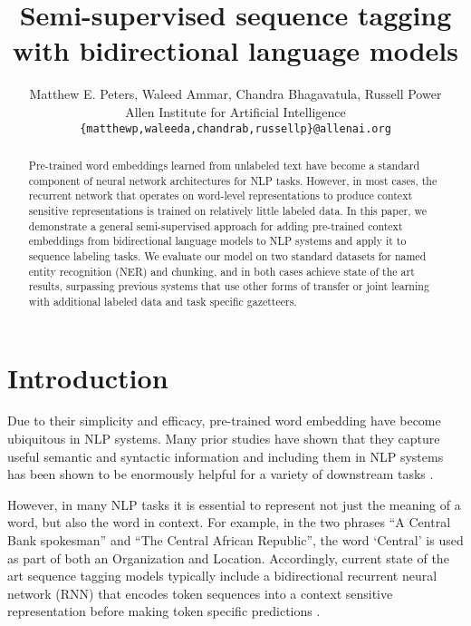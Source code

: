 \documentclass[11pt,a4paper]{article}
\title{Semi-supervised sequence tagging with bidirectional language models}
\author{Matthew E. Peters, Waleed Ammar, Chandra Bhagavatula, Russell Power \\
    Allen Institute for Artificial Intelligence \\
    {\tt \{matthewp,waleeda,chandrab,russellp\}@allenai.org}
}
\date{}
\newcommand\waadd[1]{#1}
\begin{document}
\maketitle
\begin{abstract}
Pre-trained word embeddings learned from unlabeled text
have become a standard component of neural network architectures for
NLP tasks.  However, in most cases, the recurrent
network that operates on word-level representations to produce context sensitive representations is trained on relatively little labeled data.
In this paper, we demonstrate a general semi-supervised approach for adding pre-trained context embeddings from bidirectional
language models to NLP systems and apply it to sequence labeling tasks.
We evaluate our model on two standard datasets for named entity recognition (NER) and chunking,
and in both cases achieve state of the art results, surpassing previous systems
that use other forms of transfer or joint learning with additional labeled data and task specific gazetteers.
\end{abstract}

\section{Introduction}

Due to their simplicity and efficacy, pre-trained word embedding have become ubiquitous in NLP systems.
Many prior studies have shown that they capture useful semantic and syntactic information
\citep{word2vec,Pennington2014GloveGV} and including them in NLP systems has been shown to be enormously helpful for a variety of downstream tasks \citep{NLPfromScratch:Collobert2011}.

However, in many NLP tasks it is essential to represent not just the meaning of a word, but also the word in context.  For example, in the two phrases ``A Central Bank spokesman'' and ``The Central African Republic'', the word  `Central' is used as part of both an Organization and Location.  Accordingly, current state of the art sequence tagging models typically include a bidirectional recurrent neural network (RNN) that encodes token sequences into a context sensitive representation before making token specific predictions \citep{yang-transfer-iclr07,Ma2016EndtoendSL,lample-EtAl:2016:N16-1,joint-many-iclr07}.
\end{document}
